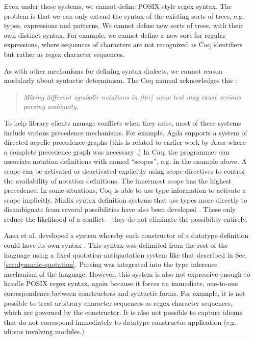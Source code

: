 Even under these systems, we cannot define POSIX-style regex syntax. The problem is that we can only extend the syntax of the existing sorts of trees, e.g. types, expressions and patterns. We cannot define new sorts of trees, with their own distinct syntax. For example, we cannot define a new sort for regular expressions, where sequences of characters are not recognized as Coq identifiers but rather as regex character sequences.

As with other mechanisms for defining syntax dialects, we cannot reason modularly about syntactic determinism. The Coq manual acknowledges this \cite{Coq:manual}: 
\begin{quote}
\emph{Mixing different symbolic notations in [the] same text may cause serious parsing ambiguity.}
\end{quote}

To help library clients manage conflicts when they arise, most of these systems include various precedence mechanisms. For example, Agda supports a system of directed acyclic precedence graphs \cite{DBLP:conf/ifl/DanielssonN08} (this is related to earlier work by Aasa where a complete precedence graph was necessary \cite{DBLP:journals/tcs/Aasa95}.) In Coq, the programmer can associate notation definitions with named ``scopes'', e.g.  in the example above. A scope can  be activated or deactivated explicitly using scope directives to control the availability of notation definitions. The innermost scope has the highest precedence. In some situations, Coq is able to use type information to activate a scope implicitly. Mixfix syntax definition systems that use types more directly to disambiguate from several possibilities have also been developed \cite{missura1997higher,wieland2009parsing}. These only reduce the likelihood of a conflict -- they do  not eliminate the possibility entirely.

Aasa et al. developed a system whereby each constructor of a datatype definition could have its own syntax \cite{DBLP:conf/lfp/AasaPS88,DBLP:conf/fpca/Aasa93}. This syntax was delimited from the rest of the language using a fixed quotation-antiquotation system like that described in Sec. \ref{sec:dynamic-quotation}. Parsing was integrated into the type inference mechanism of the language. However, this system is also not expressive enough to handle POSIX regex syntax, again because it forces an immediate, one-to-one correspondence between constructors and syntactic forms. For example, it is not possible to treat arbitrary character sequences as regex character sequences, which are governed by the  constructor. It is also not possible to capture idioms that do not correspond immediately to datatype constructor application (e.g. idioms involving modules.)


